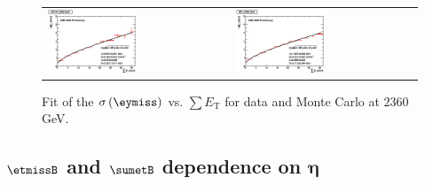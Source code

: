 \begin{figure}[h!]
 \centering
 \begin{tabular}{ll}
  \includegraphics[width=0.5\textwidth]{plots_DataVsMC_MB_2360GeV/final_metysigma_sumet_DATA_2360.eps} &
  \includegraphics[width=0.5\textwidth]{plots_DataVsMC_MB_2360GeV/final_metysigma_sumet_MC_2360.eps} \\
 \end{tabular}
 \caption{\small Fit of the $\sigma\left(\eymiss\right)$ vs. $\sum E_\text{T}$ for data and Monte Carlo at $2360$ GeV.\label{fig:MEySigma_vs_SumET_2360_fit}}
\end{figure}

\clearpage

\subsection[$\etmiss$ and $\sumet$ dependence on $\eta$]{$\etmissB$ and $\sumetB$ dependence on $\boldsymbol{\eta}$} \label{sec:MetVarVsIeta_2360}

